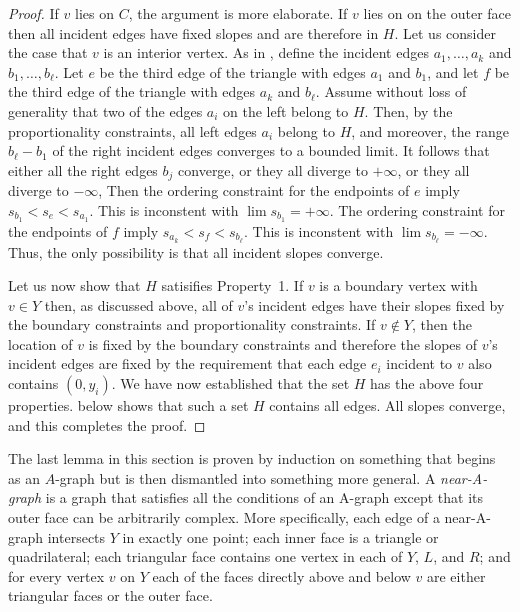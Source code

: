 \documentclass{patmorin}
\begin{document}
\begin{proof}
If $v$ lies on $C$, the argument is more elaborate. If $v$ lies on
on the outer face then all incident edges have fixed slopes and are
therefore in $H$.  Let us consider the case that $v$ is an interior
vertex.  As in , define the incident edges $a_1,\ldots,a_k$
and $b_1,\ldots,b_\ell$.  Let $e$ be the third edge of the triangle with
edges $a_1$ and $b_1$, and let
 $f$ be the third edge of the triangle with edges $a_k$ and $b_\ell$.
Assume without loss of generality that two of the edges $a_i$ on the left
belong to $H$. Then, by the proportionality constraints, all left edges
$a_i$ belong to $H$, and moreover, the range $b_\ell-b_1$ of the right
incident edges converges to a bounded limit.  It follows that either
all the right edges $b_j$ converge, or they all diverge to $+\infty$,
or they all diverge to $-\infty$, Then the ordering constraint for the
endpoints of $e$ imply
\begin{math}
  s_{b_1}<s_e<s_{a_1}
\end{math}.
This is inconstent with $\lim s_{b_1}=+\infty$.
The ordering constraint for the endpoints of $f$ imply
\begin{math}
  s_{a_k}<s_f<s_{b_\ell}
\end{math}.
This is inconstent with $\lim s_{b_\ell}=-\infty$.  Thus, the only
possibility is that all incident slopes converge.

Let us now show that $H$ satisifies Property~1.  If $v$ is a boundary
vertex with $v\in Y$ then, as discussed above, all of $v$'s incident edges
have their slopes fixed by the boundary constraints and proportionality
constraints.  If $v\not\in Y$, then the location of $v$ is fixed by the
boundary constraints and therefore the slopes of $v$'s incident edges
are fixed by the requirement that each edge $e_i$ incident to $v$ also
contains $(0,y_i)$.
We have now established that the set $H$ has
 the above four properties.
    below shows that such a set
   $H$ contains all edges. All slopes converge, and this 
   completes the proof.
\end{proof}


The last lemma in this section is proven by induction on something
that begins as an $A$-graph but is then dismantled into something
more general.  A \emph{near-A-graph} is a graph that satisfies all the
conditions of an A-graph except that its outer face can be arbitrarily
complex.  More specifically, each edge of a near-A-graph intersects $Y$
in exactly one point; each inner face is a triangle or quadrilateral;
each triangular face contains one vertex in each of $Y$, $L$, and $R$;
and for every vertex $v$ on $Y$ each of the faces directly above and
below $v$ are either triangular faces or the outer face.
\end{document}
